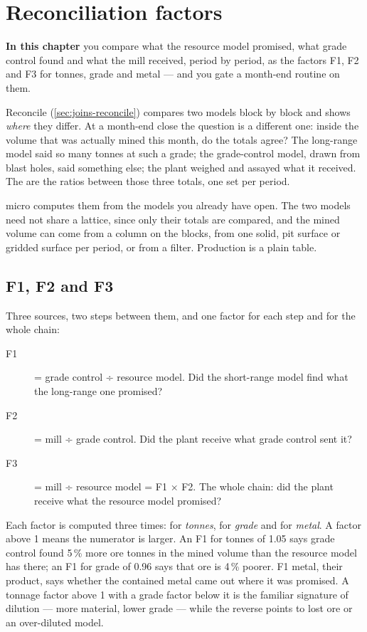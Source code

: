 \chapter{Reconciliation factors}\label{ch:factors}
\begin{goals}
\textbf{In this chapter} you compare what the resource model promised, what grade control found and what the mill received, period by period, as the factors F1, F2 and F3 for tonnes, grade and metal — and you gate a month-end routine on them.
\end{goals}

Reconcile (\cref{sec:joins-reconcile}) compares two models block by block and shows \emph{where} they differ. At a month-end close the question is a different one: inside the volume that was actually mined this month, do the totals agree? The long-range model said so many tonnes at such a grade; the grade-control model, drawn from blast holes, said something else; the plant weighed and assayed what it received. The  are the ratios between those three totals, one set per period.

micro computes them from the models you already have open. The two models need not share a lattice, since only their totals are compared, and the mined volume can come from a column on the blocks, from one solid, pit surface or gridded surface per period, or from a filter. Production is a plain table.

\section{F1, F2 and F3}\label{sec:factors-what}
Three sources, two steps between them, and one factor for each step and for the whole chain:

\begin{description}
\item[F1] = grade control ÷ resource model. Did the short-range model find what the long-range one promised?
\item[F2] = mill ÷ grade control. Did the plant receive what grade control sent it?
\item[F3] = mill ÷ resource model = F1 × F2. The whole chain: did the plant receive what the resource model promised?
\end{description}

Each factor is computed three times: for \emph{tonnes}, for \emph{grade} and for \emph{metal}. A factor above 1 means the numerator is larger. An F1 for tonnes of 1.05 says grade control found 5\,\% more ore tonnes in the mined volume than the resource model has there; an F1 for grade of 0.96 says that ore is 4\,\% poorer. F1 metal, their product, says whether the contained metal came out where it was promised. A tonnage factor above 1 with a grade factor below it is the familiar signature of dilution — more material, lower grade — while the reverse points to lost ore or an over-diluted model.

